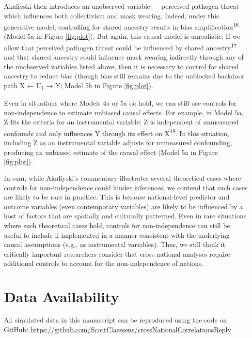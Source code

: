 \documentclass[
  man, donotrepeattitle,floatsintext]{apa6}
\begin{document}
Akaliyski then introduces an unobserved variable --- perceived pathogen threat
--- which influences both collectivism and mask wearing. Indeed, under this
generative model, controlling for shared ancestry results in bias
amplification\textsuperscript{16} (Model 5a in Figure \ref{fig:plot}).
But again, this causal model is unrealistic. If we allow that perceived pathogen
threat could be influenced by shared ancestry\textsuperscript{17} and that shared
ancestry could influence mask wearing indirectly through any of the unobserved
variables listed above, then it is necessary to control for shared ancestry to
reduce bias (though bias still remains due to the unblocked backdoor path
X ← U\textsubscript{1} → Y; Model 5b in Figure \ref{fig:plot}).

Even in situations where Models 4a or 5a do hold, we can still use controls for
non-independence to estimate unbiased causal effects. For example, in Model 5a,
Z fits the criteria for an instrumental variable: Z is independent of unmeasured
confounds and only influences Y through its effect on X\textsuperscript{18}. In this
situation, including Z as an instrumental variable adjusts for unmeasured
confounding, producing an unbiased estimate of the causal effect (Model 5a in
Figure \ref{fig:plot}).

In sum, while Akaliyski's commentary illustrates several theoretical cases
where controls for non-independence could hinder inferences, we contend that
such cases are likely to be rare in practice. This is because national-level
predictor and outcome variables (even contemporary variables) are likely to be
influenced by a host of factors that are spatially and culturally patterned.
Even in rare situations where such theoretical cases hold, controls for
non-independence can still be useful to include if implemented in a manner
consistent with the underlying causal assumptions (e.g., as instrumental
variables). Thus, we still think it critically important researchers consider
that cross-national analyses require additional controls to account for the
non-independence of nations.

\newpage
\nolinenumbers

\hypertarget{data-availability}{%
\section{Data Availability}\label{data-availability}}

All simulated data in this manuscript can be reproduced using the code on
GitHub: \url{https://github.com/ScottClaessens/crossNationalCorrelationsReply}
\end{document}

